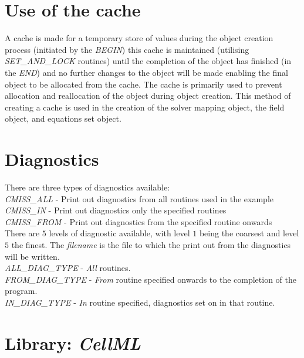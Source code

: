 \section{Use of the cache}
\label{sec:cache}

A cache is made for a temporary store of values during the object creation
process (initiated by the \emph{BEGIN}) this cache is maintained (utilising 
\emph{SET\_AND\_LOCK} routines) until the completion of the object has 
finished (in the \emph{END}) and no further changes to the object will be 
made enabling the final object to be allocated from the cache. The cache is 
primarily used to prevent allocation and reallocation of the object during 
object creation. This method of creating a cache is used in the creation of 
the solver mapping object, the field object, and equations set object.


\section{Diagnostics}
\label{sec:diagnostics}

There are three types of diagnostics available: \\
\linebreak
\emph{CMISS\_ALL} - Print out diagnostics from all routines used in the example \\
\linebreak
\emph{CMISS\_IN} - Print out diagnostics only the specified routines \\
\linebreak
\emph{CMISS\_FROM} - Print out diagnostics from the specified routine onwards \\

\noindent There are $5$ levels of diagnostic available, with level $1$ being the 
coarsest and level $5$ the finest. The \emph{filename} is the file to which the print 
out from the diagnostics will be written. \\

\noindent \emph{ALL\_DIAG\_TYPE} - \emph{All} routines. \\
\linebreak
\emph{FROM\_DIAG\_TYPE} - \emph{From} routine specified onwards to the completion of the program. \\
\linebreak
\emph{IN\_DIAG\_TYPE} - \emph{In} routine specified, diagnostics set on in that routine.


\section{Library: \emph{CellML}}
\label{sec:cellml}

